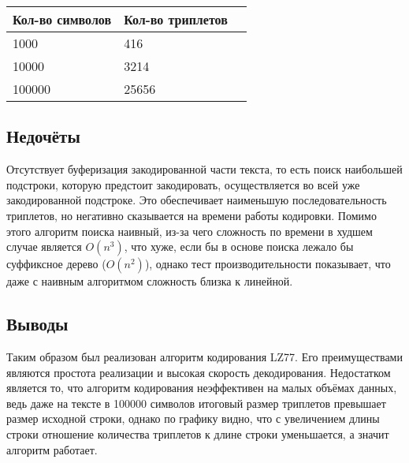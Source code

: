 \documentclass[12pt]{article}
\begin{document}

    \begin{tabular}{ | l | l | l | }
        \hline
            Кол-во символов & Кол-во триплетов \\ \hline
            1000            & 416              \\
            10000           & 3214             \\
            100000          & 25656            \\
        \hline
    \end{tabular}

    \subsection*{Недочёты}

    Отсутствует буферизация закодированной части текста, то есть поиск 
    наибольшей подстроки, которую предстоит закодировать, осуществляется во 
    всей уже закодированной подстроке. Это обеспечивает наименьшую 
    последовательность триплетов, но негативно сказывается на времени работы 
    кодировки. Помимо этого алгоритм поиска наивный, из-за чего сложность по 
    времени в худшем случае является $O(n^3)$, что хуже, если бы в основе 
    поиска лежало бы суффиксное дерево ($O(n^2)$), однако тест 
    производительности показывает, что даже с наивным алгоритмом сложность 
    близка к линейной. 

    \subsection*{Выводы}

    Таким образом был реализован алгоритм кодирования LZ77. Его преимуществами 
    являются простота реализации и высокая скорость декодирования. Недостатком 
    является то, что алгоритм кодирования неэффективен на малых объёмах данных, 
    ведь даже на тексте в 100000 символов итоговый размер триплетов превышает 
    размер исходной строки, однако по графику видно, что с увеличением длины 
    строки отношение количества триплетов к длине строки уменьшается, а значит 
    алгоритм работает.
\end{document}
